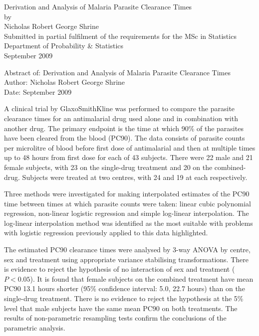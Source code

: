 \documentclass[a4paper,12pt,openright,twoside]{book}
\begin{document}
\begin{titlepage}
\vspace*{\fill}
\begin{center}
{\huge Derivation and Analysis of Malaria Parasite Clearance Times}\\[1cm]
by\\[1cm]
{\large Nicholas Robert George Shrine}\\[4cm]
Submitted in partial fulfilment of the requirements for the MSc in Statistics\\
Department of Probability \& Statistics\\[2cm]
September 2009
\end{center}
\vspace*{\fill}
\end{titlepage}
\clearpage{\pagestyle{empty}\cleardoublepage}
\frontmatter
Abstract of: Derivation and Analysis of Malaria Parasite Clearance Times\\[0.5cm]
Author: Nicholas Robert George Shrine\\[0.5cm]
Date: September 2009\\[0.1cm]
\setlength{\parindent}{0.4in}
\setlength{\parskip}{0.0in}

A clinical trial by GlaxoSmithKline was performed to compare the parasite clearance times for an antimalarial drug used alone and in combination with another drug. The primary endpoint is the time at which 90\% of the parasites have been cleared from the blood (PC90). The data consists of parasite counts per microlitre of blood before first dose of antimalarial and then at multiple times up to 48 hours from first dose for each of 43 subjects. There were 22 male and 21 female subjects, with 23 on the single-drug treatment and 20 on the combined-drug. Subjects were treated at two centres, with 24 and 19 at each respectively. 

Three methods were investigated for making interpolated estimates of the PC90 time between times at which parasite counts were taken: linear cubic polynomial regression, non-linear logistic regression and simple log-linear interpolation. The log-linear interpolation method was identified as the most suitable with problems with logistic regression previously applied to this data highlighted.

The estimated PC90 clearance times were analysed by 3-way ANOVA by centre, sex and treatment using appropriate variance stabilising transformations. There is evidence to reject the hypothesis of no interaction of sex and treatment ($P<0.05$). It is found that female subjects on the combined treatment have mean PC90 13.1 hours shorter (95\% confidence interval: 5.0, 22.7 hours) than on the single-drug treatment. There is no evidence to reject the hypothesis at the 5\% level that male subjects have the same mean PC90 on both treatments. The results of non-parametric resampling tests confirm the conclusions of the parametric analysis.
\end{document}
